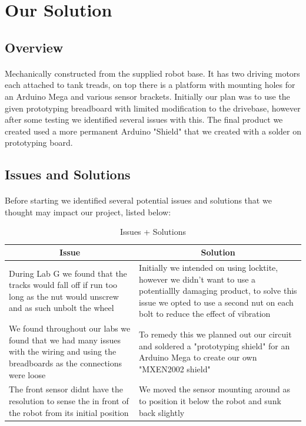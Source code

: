 \documentclass[12pt, a4paper]{article}
\newcommand{\heading}[1]{\multicolumn{1}{c}{#1}}
\begin{document}
\section{Our Solution} \label{sec:Solution}
  \subsection{Overview}
    \paragraph{}
      Mechanically constructed from the supplied robot base. It has two driving motors each attached 
      to tank treads, on top there is a platform with mounting holes for an Arduino Mega and various 
      sensor brackets. Initially our plan was to use the given prototyping breadboard with limited modification 
      to the drivebase, however after some testing we identified several issues with this. The final product we 
      created used a more permanent Arduino "Shield" that we created with a solder on prototyping board.

  \subsection{Issues and Solutions}
    \paragraph{}
      Before starting we identified several potential issues and solutions that we thought may impact 
      our project, listed below:

    \begin{table}[htbp]
       \centering
        \begin{tabularx}{\textwidth}{bb}
            \hline
            \heading{Issue} & \heading{Solution} \\ \hline
            During Lab G we found that the tracks would fall off if run too long as the nut would unscrew and as such unbolt the wheel & Initially we intended on using locktite, however we didn't want to use a potentiallly damaging product, to solve this issue we opted to use a second nut on each bolt to reduce the effect of vibration \\ \hline
            We found throughout our labs we found that we had many issues with the wiring and using the breadboards as the connections were loose & To remedy this we planned out our circuit and soldered a "prototyping shield" for an Arduino Mega to create our own "MXEN2002 shield" \\ \hline
            The front sensor didnt have the resolution to sense the in front of the robot from its initial position & We moved the sensor mounting around as to position it below the robot and sunk back slightly \\ \hline
        \end{tabularx}
      \caption{Issues + Solutions}
    \end{table}
\end{document}
